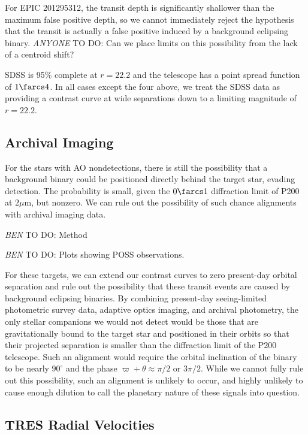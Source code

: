 \documentclass{emulateapj}
\newcommand{\todo}[3]{{\color{#2} \emph{#1} TO DO: #3}}
\newcommand{\btmtodo}[1]{\todo{BEN}{red}{#1}}
\newcommand{\anytodo}[1]{\todo{ANYONE}{NavyBlue}{#1}}
\begin{document}
For EPIC 201295312, the transit depth is significantly shallower than
the maximum false positive depth, so we cannot immediately
reject the hypothesis that the transit is actually a false positive 
induced by a background eclipsing binary. \anytodo{Can we place limits
on this possibility from the lack of a centroid shift?}

SDSS is 95\% complete at $r=22.2$ and the telescope has a point
spread function of $1\farcs4$. In all cases except the four above, we 
treat the SDSS data as providing a contrast curve at wide separations
down to a limiting magnitude of $r=22.2$.

\subsection{Archival Imaging}

For the stars with AO nondetections, there is still the
possibility that a background binary could be positioned
directly behind the target star, evading detection.
The probability is small, given the $0\farcs1$ diffraction limit
of P200 at $2\mu$m, but nonzero.
We can rule out the possibility of such chance alignments with 
archival imaging data. 

\btmtodo{Method}

\btmtodo{Plots showing POSS observations.}

For these targets, we can extend our contrast curves to zero 
present-day orbital separation and rule out the possibility that
these transit events are caused by background eclipsing binaries.
By combining present-day seeing-limited photometric survey data, 
adaptive optics imaging, and archival photometry, the only stellar companions 
we would not detect would be those that are gravitationally bound to the target 
star and positioned in their orbits so that their projected separation is
smaller than the diffraction limit of the P200 telescope.
Such an alignment would require the orbital inclination of the binary to be 
nearly $90^\circ$ and the phase $\varpi + \theta \approx \pi/2$ or $3\pi/2$.
While we cannot fully rule out this possibility, such an alignment is unlikely
to occur, and highly unlikely to cause enough dilution to call the planetary
nature of these signals into question.




\subsection{TRES Radial Velocities}
\end{document}
